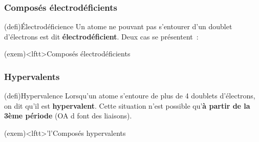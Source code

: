 \documentclass[../../main/main.tex]{subfiles}
\begin{document}
\subsubsection{Composés électrodéficients}
\begin{tcb*}(defi){Électrodéficience}
	Un atome ne pouvant pas s'entourer d'un doublet d'électrons est dit
	\textbf{électrodéficient}. Deux cas se présentent~:
	\smallbreak
  \begin{isd}[sidebyside align=top]
		\tcblower
	\end{isd}
\end{tcb*}

\begin{tcb*}(exem)<lftt>{Composés électrodéficients}
  \vspace{-15pt}
\end{tcb*}

\subsubsection{Hypervalents}

\begin{tcb*}(defi){Hypervalence}
	Lorsqu'un atome s'entoure de plus de 4 doublets d'électrons, on dit qu'il
	est \textbf{hypervalent}. Cette situation n'est possible qu'\textbf{à partir
		de la 3ème période} (OA d font des liaisons).
\end{tcb*}

\begin{tcb*}(exem)<lftt>'l'{Composés hypervalents}
  \vspace{-15pt}
\end{tcb*}
\end{document}
